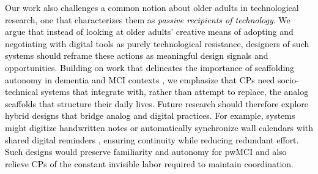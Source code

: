 \documentclass[acmsmall]{acmart}
\begin{document}
\textcolor{black}{Our work also challenges a common notion about older adults in technological research, one that characterizes them as \textit{passive recipients of technology}. We argue that instead of looking at older adults’ creative means of adopting and negotiating with digital tools as purely technological resistance, designers of such systems should reframe these actions as meaningful design signals and opportunities. Building on work that \textcolor{black}{delineates} the importance of scaffolding autonomy in dementia and MCI contexts \cite{mathur2022collaborative, zubatiy2021empowering, schurgin2021isolation}, we \textcolor{black}{emphasize that} CPs need socio-technical systems that integrate with, rather than attempt to replace, the analog scaffolds that structure their daily lives. Future research should therefore explore hybrid designs that bridge analog and digital practices. For example, systems might digitize handwritten notes or automatically synchronize wall calendars with shared digital reminders \cite{beneteau2019communication}, ensuring continuity while reducing redundant effort. Such designs would preserve familiarity and autonomy for pwMCI and also relieve CPs of the constant invisible labor required to maintain coordination.} 
\end{document}
